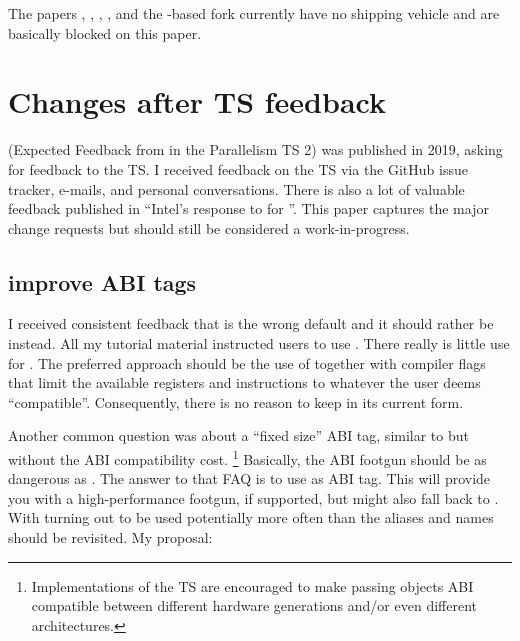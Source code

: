 The papers , , , , and
the -based  fork currently have no shipping vehicle
and are basically blocked on this paper.

\section{Changes after TS feedback}\label{sec:changes}
\cite{P1915R0} (Expected Feedback from  in the Parallelism TS 2) was published in 2019, asking for feedback to the TS.
I received feedback on the TS via the GitHub issue tracker, e-mails, and personal conversations.
There is also a lot of valuable feedback published in  ``Intel’s response to  for ''.
This paper captures the major change requests but should still be considered a work-in-progress.

\subsection{improve ABI tags}
I received consistent feedback that \simdabi{} is the wrong default and it should rather be \simdabi{} instead.
All my tutorial material instructed users to use \stdx{}.
There really is little use for \simdabi{}.
The preferred approach should be the use of \simdabi{} together with compiler flags that limit the available registers and instructions to whatever the user deems “compatible”.
Consequently, there is no reason to keep \simdabi{} in its current form.

Another common question was about a “fixed size” ABI tag, similar to \stdx\simdabi{} but without the ABI compatibility cost.%
\footnote{Implementations of the TS are encouraged to make passing  objects ABI compatible between different hardware generations and/or even different architectures.}
Basically, the ABI footgun should be as dangerous as \stdx\simdabi{}.
The answer to that FAQ is to use \stdx\simdabi{} as ABI tag.
This will provide you with a high-performance footgun, if supported, but might also fall back to \stdx\simdabi{}.
With \stdx\simdabi{} turning out to be used potentially more often than \stdx\simdabi{} the aliases and names should be revisited.
My proposal:

